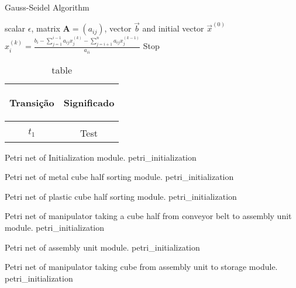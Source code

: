 \begin{algorithm2e}
\caption{Gauss-Seidel Algorithm}\label{alg:gauss-seidel}
\KwIn
{%
scalar $\epsilon$,
matrix $\mathbf{A} = (a_{ij})$,
vector $\vec{b}$
and initial vector $\vec{x}^{(0)}$
}
{
{
$
x_i^{(k)} =
\frac
{
b_i-\sum_{j=1}^{i-1}a_{ij}x_j^{(k)}
-\sum_{j=i+1}^{n}a_{ij}x_j^{(k-1)}
}%
{a_{ii}}
$\;
}
{Stop}
}
\end{algorithm2e}

\begin{table}[H]
  \centering
  \begin{tabular}{cc}
    \label{tab:tab1}
    \hypertarget{tab:1}{}
    Transição&Significado\\
    \hline \\
    \hyperlink{net:1}{$t_{1}$}&Test

  \end{tabular}
  \caption{table}
\end{table}
\OmegaSet

\clearpage

{Petri net of Initialization module.}
{petri_initialization}



{Petri net of metal cube half sorting module.}
{petri_initialization}



{Petri net of plastic cube half sorting module.}
{petri_initialization}



{Petri net of manipulator taking a cube half from conveyor belt to assembly unit
  module.}
{petri_initialization}


 
{Petri net of assembly unit module.}
{petri_initialization}



{Petri net of manipulator taking cube from assembly unit to storage module.}
{petri_initialization}

